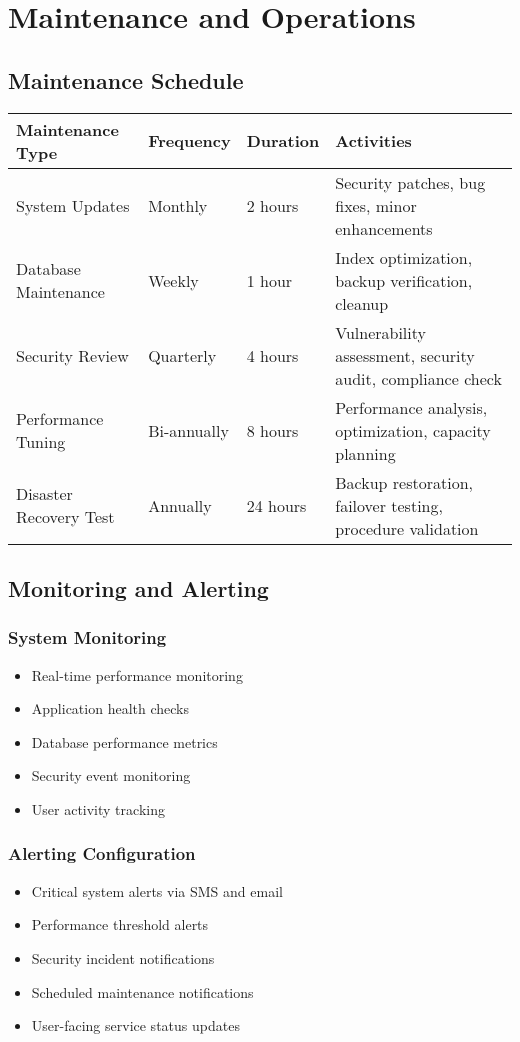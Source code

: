 \documentclass[12pt,a4paper]{article}
\begin{document}
\section{Maintenance and Operations}

\subsection{Maintenance Schedule}

\begin{longtable}{|p{3cm}|p{3cm}|p{3cm}|p{5cm}|}
\hline
\rowcolor{lightgray}
\textbf{Maintenance Type} & \textbf{Frequency} & \textbf{Duration} & \textbf{Activities} \\
\hline
System Updates & Monthly & 2 hours & Security patches, bug fixes, minor enhancements \\
\hline
Database Maintenance & Weekly & 1 hour & Index optimization, backup verification, cleanup \\
\hline
Security Review & Quarterly & 4 hours & Vulnerability assessment, security audit, compliance check \\
\hline
Performance Tuning & Bi-annually & 8 hours & Performance analysis, optimization, capacity planning \\
\hline
Disaster Recovery Test & Annually & 24 hours & Backup restoration, failover testing, procedure validation \\
\hline
\end{longtable}

\subsection{Monitoring and Alerting}

\subsubsection{System Monitoring}
\begin{itemize}
    \item Real-time performance monitoring
    \item Application health checks
    \item Database performance metrics
    \item Security event monitoring
    \item User activity tracking
\end{itemize}

\subsubsection{Alerting Configuration}
\begin{itemize}
    \item Critical system alerts via SMS and email
    \item Performance threshold alerts
    \item Security incident notifications
    \item Scheduled maintenance notifications
    \item User-facing service status updates
\end{itemize}
\end{document}
